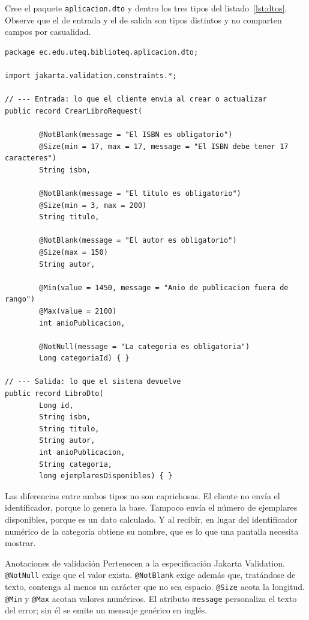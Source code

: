 \documentclass[11pt,a4paper,openany]{book}
\begin{document}
Cree el paquete \texttt{aplicacion.dto} y dentro los tres tipos del listado~\ref{lst:dtos}. Observe que el de entrada y el de salida son tipos distintos y no comparten campos por casualidad.

\begin{lstlisting}[style=java,caption={Objetos de transferencia diferenciados para entrada y salida.},label={lst:dtos}]
package ec.edu.uteq.biblioteq.aplicacion.dto;

import jakarta.validation.constraints.*;

// --- Entrada: lo que el cliente envia al crear o actualizar
public record CrearLibroRequest(

		@NotBlank(message = "El ISBN es obligatorio")
		@Size(min = 17, max = 17, message = "El ISBN debe tener 17 caracteres")
		String isbn,

		@NotBlank(message = "El titulo es obligatorio")
		@Size(min = 3, max = 200)
		String titulo,

		@NotBlank(message = "El autor es obligatorio")
		@Size(max = 150)
		String autor,

		@Min(value = 1450, message = "Anio de publicacion fuera de rango")
		@Max(value = 2100)
		int anioPublicacion,

		@NotNull(message = "La categoria es obligatoria")
		Long categoriaId) { }

// --- Salida: lo que el sistema devuelve
public record LibroDto(
		Long id,
		String isbn,
		String titulo,
		String autor,
		int anioPublicacion,
		String categoria,
		long ejemplaresDisponibles) { }
\end{lstlisting}

Las diferencias entre ambos tipos no son caprichosas. El cliente no envía el identificador, porque lo genera la base. Tampoco envía el número de ejemplares disponibles, porque es un dato calculado. Y al recibir, en lugar del identificador numérico de la categoría obtiene su nombre, que es lo que una pantalla necesita mostrar.

\begin{cajadefinicion}{Anotaciones de validación}
	Pertenecen a la especificación Jakarta Validation. \texttt{@NotNull} exige que el valor exista. \texttt{@NotBlank} exige además que, tratándose de texto, contenga al menos un carácter que no sea espacio. \texttt{@Size} acota la longitud. \texttt{@Min} y \texttt{@Max} acotan valores numéricos. El atributo \texttt{message} personaliza el texto del error; sin él se emite un mensaje genérico en inglés.
\end{cajadefinicion}
\end{document}
